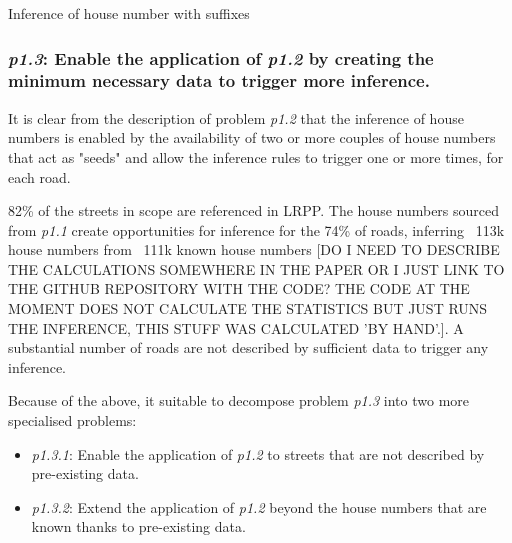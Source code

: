 \vspace{5mm}

\begin{algorithm}[H]
    \caption{Inference of house number with suffixes}
    \label{algo:inference-numbers-suffix}
\end{algorithm}

\vspace{5mm}

    \subsubsection{{\it p1.3}: Enable the application of {\it p1.2} by creating the minimum necessary data to trigger more inference.} 

        It is clear from the description of problem {\it p1.2} that the inference of house numbers is enabled by the availability of two or more couples of house numbers that act as "seeds" and allow the inference rules to trigger one or more times, for each road.
        
        82\% of the streets in scope are referenced in LRPP. The house numbers sourced from {\it p1.1} create opportunities for inference for the 74\% of roads, inferring ~113k house numbers from ~111k known house numbers [DO I NEED TO DESCRIBE THE CALCULATIONS SOMEWHERE IN THE PAPER OR I JUST LINK TO THE GITHUB REPOSITORY WITH THE CODE? THE CODE AT THE MOMENT DOES NOT CALCULATE THE STATISTICS BUT JUST RUNS THE INFERENCE, THIS STUFF WAS CALCULATED 'BY HAND'.]. A substantial number of roads are not described by sufficient data to trigger any inference. 
        
        Because of the above, it suitable to decompose problem {\it p1.3} into two more specialised problems:
        
        \begin{itemize}
            \item {\it p1.3.1}: Enable the application of {\it p1.2} to streets that are not described by pre-existing data.
            \item {\it p1.3.2}: Extend the application of {\it p1.2} beyond the house numbers that are known thanks to pre-existing data.
        \end{itemize}
        

